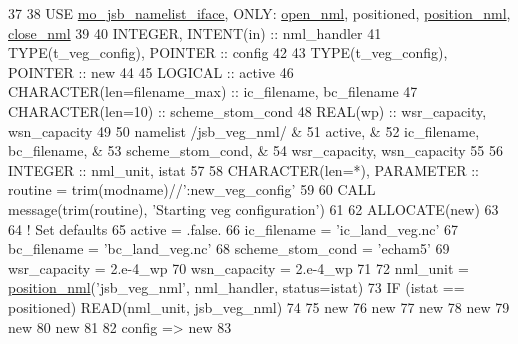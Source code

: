 \begin{DoxyCode}
37 
38     \textcolor{keywordtype}{USE }\hyperlink{namespacemo__jsb__namelist__iface}{mo\_jsb\_namelist\_iface}\textcolor{keywordtype}{, ONLY}: \hyperlink{namespacemo__jsb__namelist__iface_abb2821ffd4c30375faa307d522af3bcb}{open\_nml}, positioned, 
      \hyperlink{namespacemo__jsb__namelist__iface_a4d29dc192b429a0c5f11ecd7d7f637e9}{position\_nml}, \hyperlink{namespacemo__jsb__namelist__iface_a240047c255ab5bb3871ecdcdcd6d6a92}{close\_nml}
39 
40     \textcolor{keywordtype}{INTEGER},          \textcolor{keywordtype}{INTENT(in)} :: nml\_handler
41     \textcolor{keywordtype}{TYPE}(t\_veg\_config), \textcolor{keywordtype}{POINTER} :: config
42 
43     \textcolor{keywordtype}{TYPE}(t\_veg\_config), \textcolor{keywordtype}{POINTER} :: new
44 
45     \textcolor{keywordtype}{LOGICAL} :: active
46     \textcolor{keywordtype}{CHARACTER(len=filename\_max)} :: ic\_filename, bc\_filename
47     \textcolor{keywordtype}{CHARACTER(len=10)}           :: scheme\_stom\_cond
48     \textcolor{keywordtype}{REAL(wp)}                    :: wsr\_capacity, wsn\_capacity
49 
50     namelist /jsb\_veg\_nml/                    &
51          active,                              &
52          ic\_filename, bc\_filename,            &
53          scheme\_stom\_cond,                    &
54          wsr\_capacity, wsn\_capacity
55 
56     \textcolor{keywordtype}{INTEGER} :: nml\_unit, istat
57 
58     \textcolor{keywordtype}{CHARACTER(len=*)}, \textcolor{keywordtype}{PARAMETER} :: routine = trim(modname)//\textcolor{stringliteral}{':new\_veg\_config'}
59 
60     \textcolor{keyword}{CALL }message(trim(routine), \textcolor{stringliteral}{'Starting veg configuration'})
61 
62     \textcolor{keyword}{ALLOCATE}(new)
63 
64     \textcolor{comment}{! Set defaults}
65     active           = .false.
66     ic\_filename      = \textcolor{stringliteral}{'ic\_land\_veg.nc'}
67     bc\_filename      = \textcolor{stringliteral}{'bc\_land\_veg.nc'}
68     scheme\_stom\_cond = \textcolor{stringliteral}{'echam5'}
69     wsr\_capacity     = 2.e-4\_wp
70     wsn\_capacity     = 2.e-4\_wp
71 
72     nml\_unit = \hyperlink{namespacemo__jsb__namelist__iface_a4d29dc192b429a0c5f11ecd7d7f637e9}{position\_nml}(\textcolor{stringliteral}{'jsb\_veg\_nml'}, nml\_handler, status=istat)
73     \textcolor{keywordflow}{IF} (istat == positioned) \textcolor{keyword}{READ}(nml\_unit, jsb\_veg\_nml)
74 
75     new%
76     new%
77     new%
78     new%
79     new%
80     new%
81 
82     config => new
83 
\end{DoxyCode}


